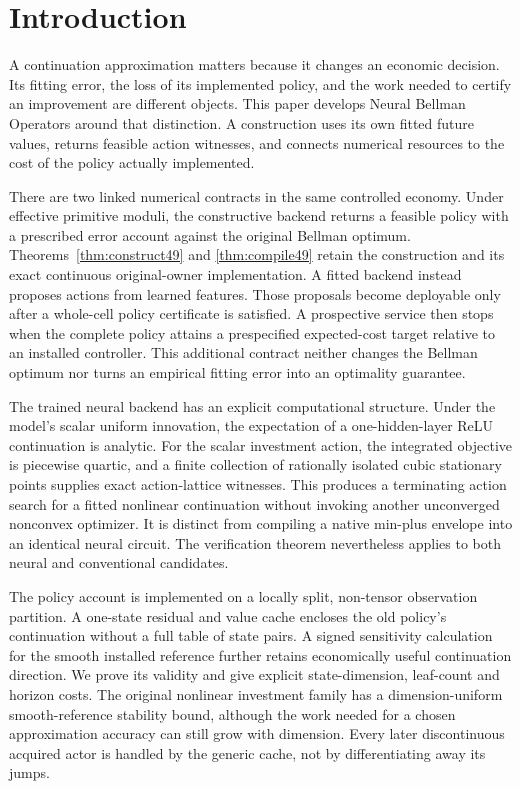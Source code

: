 \section{Introduction}\label{sec:introduction56}
A continuation approximation matters because it changes an economic decision. Its fitting error, the loss of its implemented policy, and the work needed to certify an improvement are different objects. This paper develops Neural Bellman Operators around that distinction. A construction uses its own fitted future values, returns feasible action witnesses, and connects numerical resources to the cost of the policy actually implemented.

There are two linked numerical contracts in the same controlled economy. Under effective primitive moduli, the constructive backend returns a feasible policy with a prescribed error account against the original Bellman optimum. Theorems~\ref{thm:construct49} and \ref{thm:compile49} retain the construction and its exact continuous original-owner implementation. A fitted backend instead proposes actions from learned features. Those proposals become deployable only after a whole-cell policy certificate is satisfied. A prospective service then stops when the complete policy attains a prespecified expected-cost target relative to an installed controller. This additional contract neither changes the Bellman optimum nor turns an empirical fitting error into an optimality guarantee.

The trained neural backend has an explicit computational structure. Under the model's scalar uniform innovation, the expectation of a one-hidden-layer ReLU continuation is analytic. For the scalar investment action, the integrated objective is piecewise quartic, and a finite collection of rationally isolated cubic stationary points supplies exact action-lattice witnesses. This produces a terminating action search for a fitted nonlinear continuation without invoking another unconverged nonconvex optimizer. It is distinct from compiling a native min-plus envelope into an identical neural circuit. The verification theorem nevertheless applies to both neural and conventional candidates.

The policy account is implemented on a locally split, non-tensor observation partition. A one-state residual and value cache encloses the old policy's continuation without a full table of state pairs. A signed sensitivity calculation for the smooth installed reference further retains economically useful continuation direction. We prove its validity and give explicit state-dimension, leaf-count and horizon costs. The original nonlinear investment family has a dimension-uniform smooth-reference stability bound, although the work needed for a chosen approximation accuracy can still grow with dimension. Every later discontinuous acquired actor is handled by the generic cache, not by differentiating away its jumps.

